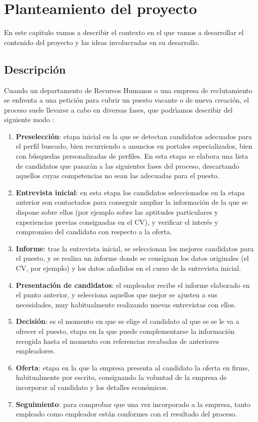 
\chapter{Planteamiento del proyecto}

En este cap\'\i tulo vamos a describir el contexto en el que vamos a desarrollar el contenido del 
proyecto y las ideas involucradas en su desarrollo.

\section{Descripci\'on}
Cuando un departamento de Recursos Humanos o una empresa de reclutamiento se enfrenta a una petici\'on para
cubrir un puesto vacante o de nueva creaci\'on, el proceso suele llevarse a cabo en diversas fases, que 
podr\'\i amos describir del siguiente modo \cite{proceso_seleccion1}:
\begin{enumerate}
\item {\bf Preselección}: etapa inicial en la que se detectan candidatos adecuados para el perfil buscado, bien recurriendo a 
anuncios en portales especializados, bien con b\'usquedas personalizadas de perfiles. En esta etapa se elabora una lista 
de candidatos que pasar\'an a las siguientes fases del proceso, descartando aquellos cuyas competencias no sean las adecuadas
para el puesto. 
\item {\bf Entrevista inicial}: en esta etapa los candidatos seleccionados en la etapa anterior son contactados para  
conseguir ampliar la informaci\'on de la que se dispone sobre ellos  (por ejemplo sobre las aptitudes
particulares y experiencias previas consignadas en el CV), y verificar el inter\'es y compromiso del candidato
con respecto a la oferta.
\item {\bf Informe}: tras la entrevista inicial, se seleccionan los mejores candidatos para el puesto, y se realiza un informe
donde se consignan los datos originales (el CV, por ejemplo) y los datos a\~nadidos en el curso de la entrevista inicial.
\item {\bf Presentaci\'on de candidatos}: el empleador recibe el informe elaborado en el punto anterior, y selecciona aquellos
que mejor se ajusten a sus necesidades, muy habitualmente realizando nuevas entrevistas con ellos.
\item {\bf Decisi\'on}: es el momento en que se elige el candidato al que se se le va a ofrecer el puesto, etapa en la 
que puede complementarse la informaci\'on recogida hasta el momento con re\-fe\-ren\-cias recabadas de anteriores empleadores.
\item {\bf Oferta}: etapa en la que la empresa presenta al candidato la oferta en firme, habitualmente por escrito, consignando 
la voluntad de la empresa de incorporar al candidato y los detalles econ\'omicos. 
\item {\bf Seguimiento}:  para comprobar que una vez incorporado a la empresa, tanto empleado como empleador est\'an conformes con
el resultado del proceso.
\end{enumerate}

